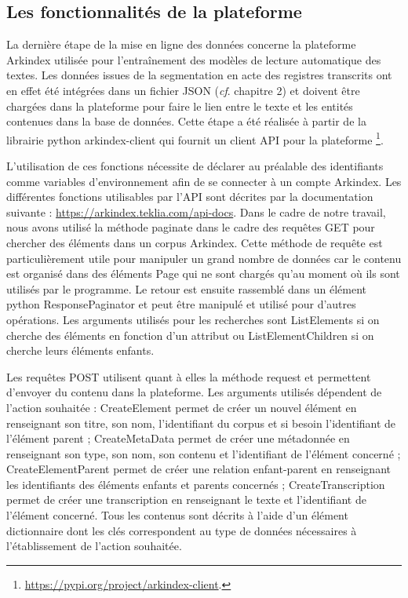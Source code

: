 \documentclass[a4paper,12pt,twoside]{book}
\begin{document}
	\subsection{Les fonctionnalités de la plateforme}
	
	La dernière étape de la mise en ligne des données concerne la plateforme Arkindex utilisée pour l'entraînement des modèles de lecture automatique des textes. Les données issues de la segmentation en acte des registres transcrits ont en effet été intégrées dans un fichier JSON (\textit{cf}. chapitre 2) et doivent être chargées dans la plateforme pour faire le lien entre le texte et les entités contenues dans la base de données. Cette étape a été réalisée à partir de la librairie python arkindex-client qui fournit un client API pour la plateforme \footnote{\url{https://pypi.org/project/arkindex-client}.}.
	
	L'utilisation de ces fonctions nécessite de déclarer au préalable des identifiants comme variables d'environnement afin de se connecter à un compte Arkindex. Les différentes fonctions utilisables par l'API sont décrites par la documentation suivante : \url{https://arkindex.teklia.com/api-docs}. Dans le cadre de notre travail, nous avons utilisé la méthode \og paginate\fg{} dans le cadre des requêtes GET pour chercher des éléments dans un corpus Arkindex. Cette méthode de requête est particulièrement utile pour manipuler un grand nombre de données car le contenu est organisé dans des éléments \og Page\fg{} qui ne sont chargés qu'au moment où ils sont utilisés par le programme. Le retour est ensuite rassemblé dans un élément python ResponsePaginator et peut être manipulé et utilisé pour d'autres opérations. Les arguments utilisés pour les recherches sont \og ListElements \fg{} si on cherche des éléments en fonction d'un attribut ou \og ListElementChildren \fg{} si on cherche leurs éléments enfants.
	
	Les requêtes POST utilisent quant à elles la méthode \og request\fg{} et permettent d'envoyer du contenu dans la plateforme. Les arguments utilisés dépendent de l'action souhaitée : \og CreateElement\fg{} permet de créer un nouvel élément en renseignant son titre, son nom, l'identifiant du corpus et si besoin l'identifiant de l'élément parent ; \og CreateMetaData\fg{} permet de créer une métadonnée en renseignant son type, son nom, son contenu et l'identifiant de l'élément concerné ; \og CreateElementParent\fg{} permet de créer une relation enfant-parent en renseignant les identifiants des éléments enfants et parents concernés ; \og CreateTranscription\fg{} permet de créer une transcription en renseignant le texte et l'identifiant de l'élément concerné. Tous les contenus sont décrits à l'aide d'un élément dictionnaire dont les clés correspondent au type de données nécessaires à l'établissement de l'action souhaitée.
	
\end{document}
